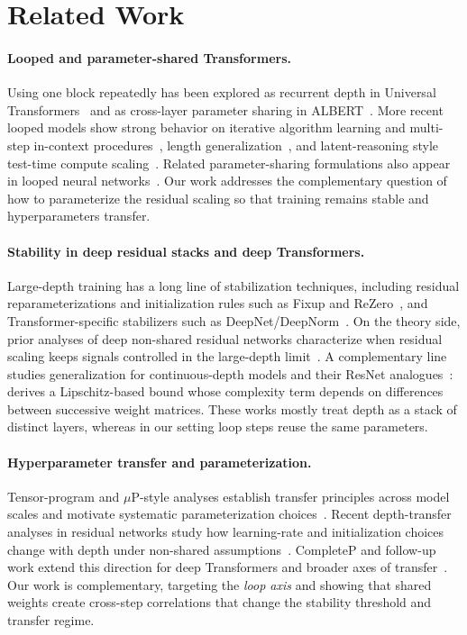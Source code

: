 \section{Related Work}
\label{sec:related-work}

\paragraph{Looped and parameter-shared Transformers.}
Using one block repeatedly has been explored as recurrent depth in
Universal Transformers~\citep{dehghani2018universal} and as cross-layer
parameter sharing in ALBERT~\citep{lan2019albert}. More recent looped
models show strong behavior on iterative algorithm learning and
multi-step in-context procedures~\citep{yang2023looped,gatmiry2024multistep},
length generalization~\citep{fan2024looped}, and latent-reasoning style
test-time compute scaling~\citep{saunshi2025latent,zhu2025ouro}. Related
parameter-sharing formulations also appear in looped neural networks~\citep{ng2024loopnn}. Our work addresses the complementary question of how to parameterize the residual scaling so that training remains stable and hyperparameters transfer.

\paragraph{Stability in deep residual stacks and deep Transformers.}
Large-depth training has a long line of stabilization techniques,
including residual reparameterizations and initialization rules such as
Fixup and ReZero~\citep{zhang2019fixup,bachlechner2020rezero}, and
Transformer-specific stabilizers such as DeepNet/DeepNorm~\citep{wang2022deepnet}. On the theory side, prior analyses of deep
non-shared residual networks characterize when residual scaling keeps
signals controlled in the large-depth limit~\citep{marion2022scalingresnets}. A complementary line studies
generalization for continuous-depth models and their ResNet analogues~\citep{DBLP:conf/nips/ChenRBD18}:
\citet{marion2023generalization} derives a Lipschitz-based bound whose
complexity term depends on differences between successive weight
matrices. These works mostly treat depth as a
stack of distinct layers, whereas in our setting loop steps reuse the
same parameters.

\paragraph{Hyperparameter transfer and parameterization.}
Tensor-program and $\mu$P-style analyses establish transfer principles
across model scales and motivate systematic parameterization choices~\citep{yang2022tensorprogramsV}. Recent depth-transfer analyses in
residual networks study how learning-rate and initialization choices
change with depth under non-shared assumptions~\citep{bordelon2024depthwise,hayou2023commute}. CompleteP and follow-up
work extend this direction for deep Transformers and broader axes of
transfer~\citep{dey2025completep,mlodozeniec2025completed}. Our work is complementary, targeting the \emph{loop axis} and showing that shared weights create cross-step correlations that change the stability threshold and transfer regime.
